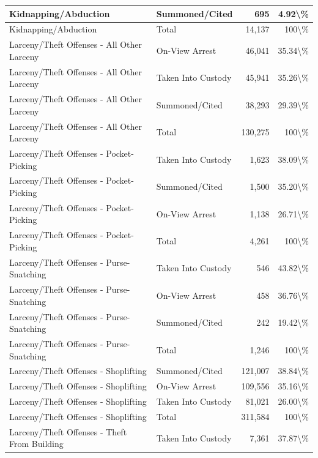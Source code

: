 \documentclass[
]{krantz}
\begin{document}
\begin{longtable}[t]{l|l|r|r}
\hline
Kidnapping/Abduction & Summoned/Cited & 695 & 4.92\textbackslash{}\%\\
\hline
Kidnapping/Abduction & Total & 14,137 & 100\textbackslash{}\%\\
\hline
Larceny/Theft Offenses - All Other Larceny & On-View Arrest & 46,041 & 35.34\textbackslash{}\%\\
\hline
Larceny/Theft Offenses - All Other Larceny & Taken Into Custody & 45,941 & 35.26\textbackslash{}\%\\
\hline
Larceny/Theft Offenses - All Other Larceny & Summoned/Cited & 38,293 & 29.39\textbackslash{}\%\\
\hline
Larceny/Theft Offenses - All Other Larceny & Total & 130,275 & 100\textbackslash{}\%\\
\hline
Larceny/Theft Offenses - Pocket-Picking & Taken Into Custody & 1,623 & 38.09\textbackslash{}\%\\
\hline
Larceny/Theft Offenses - Pocket-Picking & Summoned/Cited & 1,500 & 35.20\textbackslash{}\%\\
\hline
Larceny/Theft Offenses - Pocket-Picking & On-View Arrest & 1,138 & 26.71\textbackslash{}\%\\
\hline
Larceny/Theft Offenses - Pocket-Picking & Total & 4,261 & 100\textbackslash{}\%\\
\hline
Larceny/Theft Offenses - Purse-Snatching & Taken Into Custody & 546 & 43.82\textbackslash{}\%\\
\hline
Larceny/Theft Offenses - Purse-Snatching & On-View Arrest & 458 & 36.76\textbackslash{}\%\\
\hline
Larceny/Theft Offenses - Purse-Snatching & Summoned/Cited & 242 & 19.42\textbackslash{}\%\\
\hline
Larceny/Theft Offenses - Purse-Snatching & Total & 1,246 & 100\textbackslash{}\%\\
\hline
Larceny/Theft Offenses - Shoplifting & Summoned/Cited & 121,007 & 38.84\textbackslash{}\%\\
\hline
Larceny/Theft Offenses - Shoplifting & On-View Arrest & 109,556 & 35.16\textbackslash{}\%\\
\hline
Larceny/Theft Offenses - Shoplifting & Taken Into Custody & 81,021 & 26.00\textbackslash{}\%\\
\hline
Larceny/Theft Offenses - Shoplifting & Total & 311,584 & 100\textbackslash{}\%\\
\hline
Larceny/Theft Offenses - Theft From Building & Taken Into Custody & 7,361 & 37.87\textbackslash{}\%\\

\end{longtable}
\end{document}
